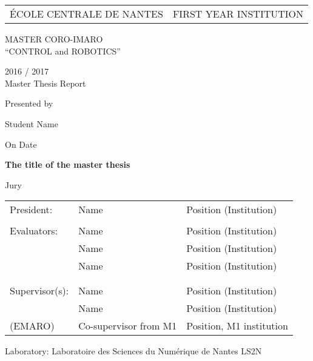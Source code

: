 \thispagestyle{empty}

\def\lskip{\vspace{0.5cm}}


\begin{tabular}{p{7cm}p{8cm}}
ÉCOLE CENTRALE DE NANTES
&
\raggedleft FIRST YEAR INSTITUTION	%
\end{tabular}

\vspace{2cm}

\begin{center} \large\sc MASTER CORO-IMARO\\ \normalsize{``CONTROL and ROBOTICS''} \end{center}



\begin{center}
	2016 / 2017\\
	\lskip
	Master Thesis Report
	\lskip
	
	Presented by \lskip 
	
	Student Name \lskip
	
	On Date \lskip\lskip
	
	{\Large \textbf{The title of the master thesis}}
	
	\vfill

Jury \lskip
		
	\end{center}
	


\begin{tabular}{p{3cm}p{7cm}p{5cm} }
 President: & Name & Position (Institution) \\ & & \\ 
 Evaluators: & Name & Position (Institution) \\
	      & Name & Position (Institution) \\ 
	      & Name & Position (Institution) \\ & & \\  & & \\ 
  Supervisor(s):  & Name & Position (Institution) \\
		  & Name & Position (Institution) \\
(EMARO)  & Co-supervisor from M1 & Position, M1 institution 
\end{tabular}

\lskip

\begin{flushleft}
 Laboratory: Laboratoire des Sciences du Numérique de Nantes LS2N
\end{flushleft}

\newpage
\thispagestyle{empty}
\null
\newpage
\addtocounter{page}{-1}
\pagestyle{fancy}
